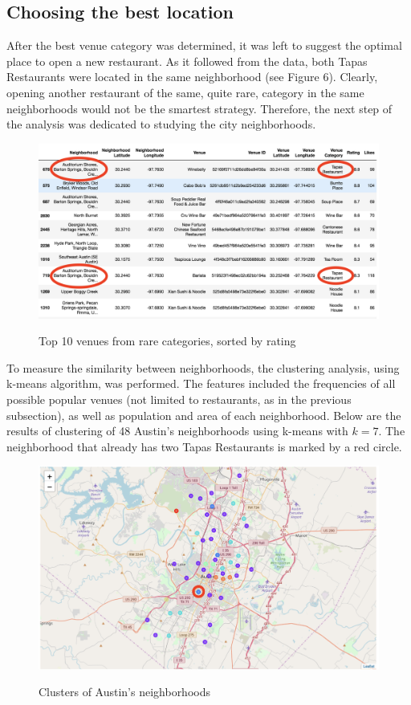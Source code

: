 \documentclass[11pt]{article}
\numberwithin{equation}{section}
\begin{document}
\subsection{Choosing the best location}
After the best venue category was determined, it was left to suggest the optimal place to open a new restaurant. As it followed from the data, both Tapas Restaurants were located in the same neighborhood (see Figure 6). Clearly, opening another restaurant of the same, quite rare, category in the same neighborhoods would not be the smartest strategy. Therefore, the next step of the analysis was dedicated to studying the city neighborhoods.
\begin{figure}[H]
	\centering
	\includegraphics[width=.9\textwidth]{pics/top_10_rare}
		\label{fig:1_1}
	\caption{Top 10 venues from rare categories, sorted by rating}
	\label{fig:4}
\end{figure}
%
To measure the  similarity between neighborhoods, the clustering analysis, using k-means algorithm, was performed. The features included the frequencies of all possible popular venues (not limited to restaurants, as in the previous subsection), as well as population and area of each neighborhood. Below are the results of clustering of 48 Austin's neighborhoods using k-means with $k=7$. The neighborhood that already has two Tapas Restaurants is marked by a red circle.
\begin{figure}[H]
	\centering
	\includegraphics[width=.9\textwidth]{pics/clusters}
		\label{fig:1_1}
	\caption{Clusters of Austin's neighborhoods}
	\label{fig:4}
\end{figure}
\end{document}
